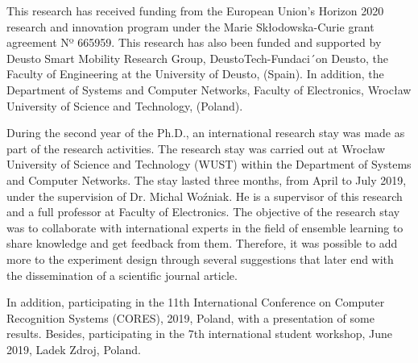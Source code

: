 This research has received funding from the European Union’s Horizon 2020 research and innovation program under the Marie Skłodowska-Curie grant agreement Nº 665959. This research has also been funded and supported
by Deusto Smart Mobility Research Group, DeustoTech-Fundaci´on Deusto, the
Faculty of Engineering at the University of Deusto, (Spain). In addition, the Department of Systems and Computer Networks, Faculty of Electronics, Wrocław University of Science and Technology, (Poland).


During the second year of the Ph.D., an international research stay was made as
part of the research activities. The research stay was carried out at Wrocław University of Science and Technology (WUST) within the Department of Systems and Computer Networks. The stay lasted three months, from April to July 2019, under the supervision
of Dr. Michal Wo{\'{z}}niak. He is a supervisor of this research and a full professor at
Faculty of Electronics. The objective of the research stay was to
collaborate with international experts in the field of ensemble learning to share knowledge and get feedback from them. Therefore, it was possible to add more to the experiment design through several suggestions that later end with the dissemination of a scientific journal article.

In addition, participating in the 11th International Conference on Computer Recognition Systems (CORES), 2019, Poland, with a presentation of some results. Besides, participating in the 7th international student workshop, June 2019, Ladek Zdroj, Poland.  



